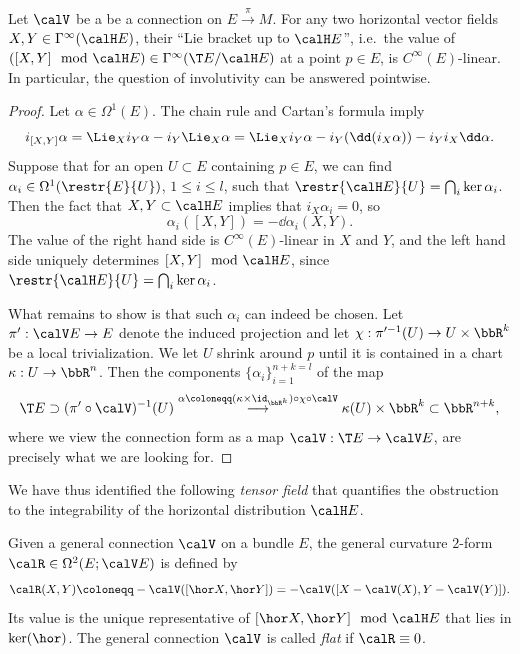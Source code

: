 \begin{prop}
    Let $\calV$ be a be a connection on $E\overset{\pi}{\to}M$. For any two horizontal vector fields $X,Y\in\Gamma^\infty(\calH E)$, their ``Lie bracket up to $\calH E$'', i.e.\ the value of $([X,Y]\mod \calH E)\in \Gamma^\infty(\T E\slash \calH E)$ at a point $p\in E$, is $C^\infty(E)$-linear. In particular, the question of involutivity can be answered pointwise.
\end{prop}
\begin{proof}
    Let $\alpha\in\Omega^1(E)$. The chain rule and Cartan's formula imply
    \[i_{[X,Y]}\alpha=\Lie_Xi_Y \alpha-i_Y \Lie_X\alpha=\Lie_Xi_Y\alpha-i_Y(\dd (i_X\alpha))-i_Yi_X\dd\alpha.\]
    Suppose that for an open $U\subset E$ containing $p\in E$, we can find $\alpha_i\in\Omega^1(\restr{E}{U})$, $1\leq i\leq l$, such that $\restr{\calH E}{U}=\bigcap_i\ker\alpha_i$. Then the fact that $X,Y\subset \calH E$ implies that $i_X\alpha_i=0$, so
    \[\alpha_i([X,Y])=-\dd\alpha_i(X,Y).\]
    The value of the right hand side is $C^\infty(E)$-linear in $X$ and $Y$, and the left hand side uniquely determines $[X,Y]\mod \calH E$, since $\restr{\calH E}{U}=\bigcap_i \ker\alpha_i$. 

    What remains to show is that such $\alpha_i$ can indeed be chosen. Let $\pi':\calV E\to E$ denote the induced projection and let $\chi:\pi^{\prime-1}(U)\to U\times\bbR^k$ be a local trivialization. We let $U$ shrink around $p$ until it is contained in a chart $\kappa:U\to \bbR^n$. Then the components $\{\alpha_i\}_{i=1}^{n+k=l}$ of the map
    \[\T E\supset (\pi'\circ\calV)^{-1}(U)\overset{\alpha\coloneqq (\kappa\times\id_{\bbR^k})\circ\chi\circ \calV}{\longrightarrow}\kappa(U)\times\bbR^k\subset \bbR^{n+k},\]
    where we view the connection form as a map $\calV:\T E\to \calV E$, are precisely what we are looking for.
\end{proof}

We have thus identified the following \emph{tensor field} that quantifies the obstruction to the integrability of the horizontal distribution $\calH E$.

\begin{defn}
    Given a general connection $\calV$ on a bundle $E$, the general curvature $2$-form $\calR\in \Omega^2(E;\calV E)$ is defined by
    \[\calR(X,Y)\coloneqq -\calV([\hor X,\hor Y])=-\calV([X-\calV(X),Y-\calV(Y)]).\]
    Its value is the unique representative of $[\hor X,\hor Y]\mod \calH E$ that lies in $\ker(\hor)$. The general connection $\calV$ is called \emph{flat} if $\calR\equiv 0$.
\end{defn}


